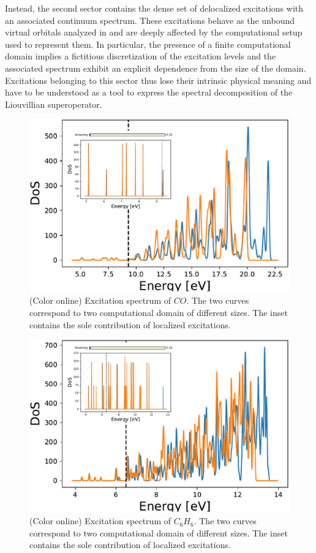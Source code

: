 \documentclass[reprint,aps,prb]{revtex4-1}
\begin{document}
Instead, the second sector contains the dense set of delocalized excitations with an associated continuum spectrum. These excitations behave as the unbound virtual orbitals analyzed in \cite{boffi2016} 
and are deeply affected by the computational setup used to represent them. In particular, the presence of a finite computational domain implies a fictitious discretization of the excitation levels and 
the associated spectrum exhibit an explicit dependence from the size of the domain. Excitations belonging to this sector thus lose their intrinsic physical meaning and have to be understood as a tool to 
express the spectral decomposition of the Liouvillian superoperator. 

\begin{figure}[ht]
\includegraphics[scale=0.24]{CO_exc.eps}
\caption{(Color online) Excitation spectrum of $CO$. The two curves correspond to two computational domain of different sizes. The inset contains the sole contribution of localized excitations.}
\label{CO_exc}
\end{figure}

\begin{figure}[ht]
\includegraphics[scale=0.24]{C6H6_exc.eps}
\caption{(Color online) Excitation spectrum of $C_6H_6$. The two curves correspond to two computational domain of different sizes. The inset contains the sole contribution of localized excitations.}
\label{C6H6_exc}
\end{figure}
\end{document}
